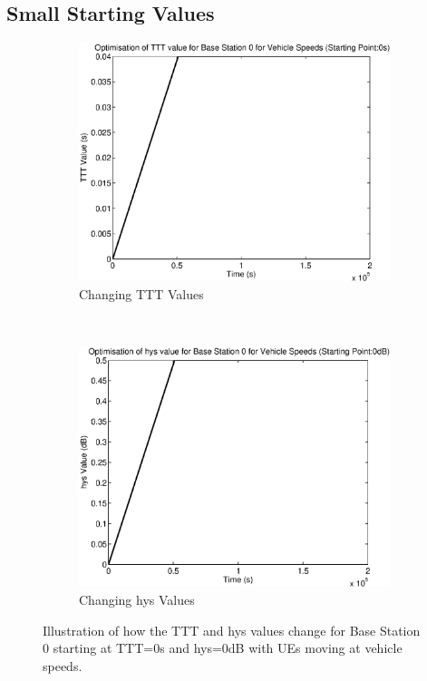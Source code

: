 \subsection{Small Starting Values}\label{ap:veh_low}
\begin{figure}[H]
        \centering
        \begin{subfigure}[b]{0.49\textwidth}
                \includegraphics[width=\textwidth]{figures/graphs/vehlow/TTT0.eps}
                \caption{Changing TTT Values}
        \end{subfigure}%
        ~ %
        \begin{subfigure}[b]{0.49\textwidth}
                \includegraphics[width=\textwidth]{figures/graphs/vehlow/hys0.eps}
                \caption{Changing hys Values}
        \end{subfigure}
        \caption{Illustration of how the TTT and hys values change for Base Station 0 starting at TTT=0s and hys=0dB with UEs moving at vehicle speeds.}
\end{figure}

